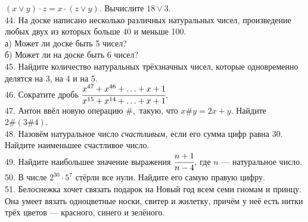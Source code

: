 \documentclass[12pt]{article}
\begin{document}
$(x\vee y)\cdot z=x\cdot(z\vee y).$ Вычислите $18\vee 3.$\\
44. На доске написано несколько различных натуральных чисел, произведение любых
двух из которых больше 40 и меньше 100.\\
а) Может ли доске быть 5 чисел?\\
б) Может ли на доске быть 6 чисел?\\
45. Найдите количество натуральных трёхзначных чисел, которые одновременно делятся на 3, на 4 и на 5.\\
46. Сократите дробь $\cfrac{x^{47}+x^{46}+\ldots+x+1}{x^{15}+x^{14}+\ldots+x+1}.$\\
47. Антон  ввёл новую операцию $\#,$ такую, что $x\#y=2x+y.$ Найдите $2\#(3\#4).$\\
48. Назовём натуральное число {\it счастливым,} если его сумма цифр равна 30. Найдите наименьшее счастливое число.\\
49. Найдите наибольшее значение выражения $\cfrac{n+1}{n-4},$ где $n$ --- натуральное число.\\
50. В числе $2^{30}\cdot5^7$ стёрли все нули. Найдите его самую правую цифру.\\
51. Белоснежка хочет связать подарок на Новый год всем семи гномам и принцу. Она умеет вязать одноцветные носки, свитер и жилетку, причём у неё есть нитки трёх цветов --- красного, синего и зелёного.
\end{document}
